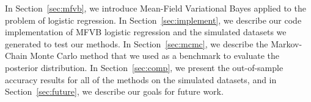 In Section~\ref{sec:mfvb}, we introduce Mean-Field Variational Bayes applied to the problem of logistic regression.  In Section~\ref{sec:implement}, we describe our code implementation of MFVB logistic regression and the simulated datasets we generated to test our methods.  In Section~\ref{sec:mcmc}, we describe the Markov-Chain Monte Carlo method that we used as a benchmark to evaluate the posterior distribution.  In Section~\ref{sec:comp}, we present the out-of-sample accuracy results for all of the methods on the simulated datasets, and in Section~\ref{sec:future}, we describe our goals for future work.  